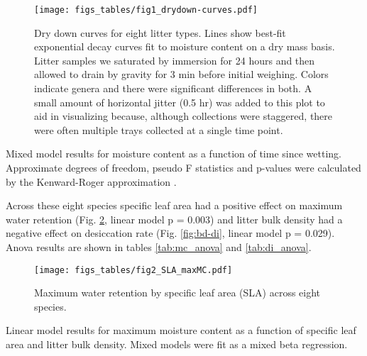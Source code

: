 \documentclass[fire,article,submit,moreauthors,pdftex]{Definitions/mdpi}
\begin{document}
\begin{figure}[H]
  \centering
\texttt{[image: figs\_tables/fig1\_drydown-curves.pdf]}
\caption{Dry down curves for eight litter types. Lines show best-fit
  exponential decay curves fit to moisture content on a dry mass basis. Litter
  samples we saturated by immersion for 24 hours and then allowed to drain by
  gravity for 3 min before initial weighing. Colors indicate genera and there
  were significant differences in both. A small amount of horizontal jitter
  (0.5 hr) was added to this plot to aid in visualizing because, although
  collections were staggered, there were often multiple trays collected at a
  single time point.}
 \label{fig:drydown}
\end{figure}


\begin{table}[H]
  \caption{Mixed model results for moisture content as a function of time since
    wetting. Approximate degrees of freedom, pseudo F statistics and p-values
    were calculated by the Kenward-Roger approximation
    \cite{Kenward_Roger-1997}.}
  \label{tab:drydown}
\centering

\end{table}


Across these eight species specific leaf area had a positive effect on maximum
water retention (Fig. \ref{fig:maxmc-di}, linear model p = 0.003) and litter
bulk density had a negative effect on desiccation rate (Fig. \ref{fig:bd-di},
linear model p = 0.029). Anova results are shown in tables \ref{tab:mc_anova}
and \ref{tab:di_anova}.

\begin{figure}[H]
  \centering
\texttt{[image: figs\_tables/fig2\_SLA\_maxMC.pdf]}
\caption{Maximum water retention by specific leaf area (SLA) across eight species.}
  \label{fig:maxmc-di}
\end{figure}

\begin{table}[H]
  \caption{Linear model results for maximum moisture content as a function of specific leaf area and litter bulk density. Mixed models were fit as a mixed beta regression. }
  \label{tab:mc_anova}
\centering

\end{table}
\end{document}
